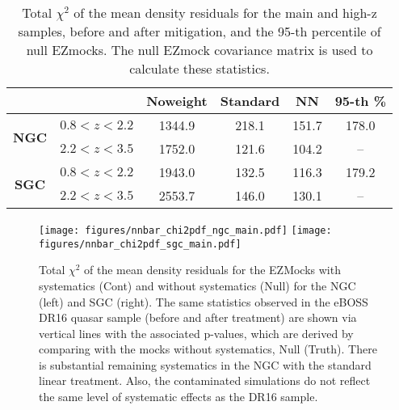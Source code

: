 \begin{table}
    \centering
    \caption[Total $\chi^{2}$ for eBOSS quasars for North and South Galactic caps.]{Total $\chi^{2}$ of the mean density residuals for the main and high-z samples, before and after mitigation, and the 95-th percentile of null EZmocks. The null EZmock covariance matrix is used to calculate these statistics.}
    \begin{tabular}{c|ccccc}
    & & Noweight & Standard & NN & 95-th \%\\
    \hline 
    \multirow{2}{*}{\textbf{NGC}} & $0.8<z<2.2$ & 1344.9 & 218.1 & 151.7 & 178.0\\
                                  & $2.2<z<3.5$ & 1752.0 & 121.6 & 104.2 & -- \\
        \hline
        \multirow{2}{*}{\textbf{SGC}}& $0.8<z<2.2$ & 1943.0 & 132.5 & 116.3 & 179.2\\
                            & $2.2<z<3.5$ & 2553.7 & 146.0 & 130.1 & --
    \end{tabular}    
    \label{tab:chi2_nbar}
\end{table}

\begin{figure*}
    \centering
    \texttt{[image: figures/nnbar\_chi2pdf\_ngc\_main.pdf]}
    \texttt{[image: figures/nnbar\_chi2pdf\_sgc\_main.pdf]}
    \caption[Total chi-squared value of eBOSS quasars from mean density contrast.]{Total $\chi^{2}$ of the mean density residuals for the EZMocks with systematics (Cont) and without systematics (Null) for the NGC (left) and SGC (right). The same statistics observed in the eBOSS DR16 quasar sample (before and after treatment) are shown via vertical lines with the associated p-values, which are derived by comparing with the mocks without systematics, Null (Truth). There is substantial remaining systematics in the NGC with the standard linear treatment. Also, the contaminated simulations do not reflect the same level of systematic effects as the DR16 sample.}
    \label{fig:chi2_nbar}
\end{figure*}


